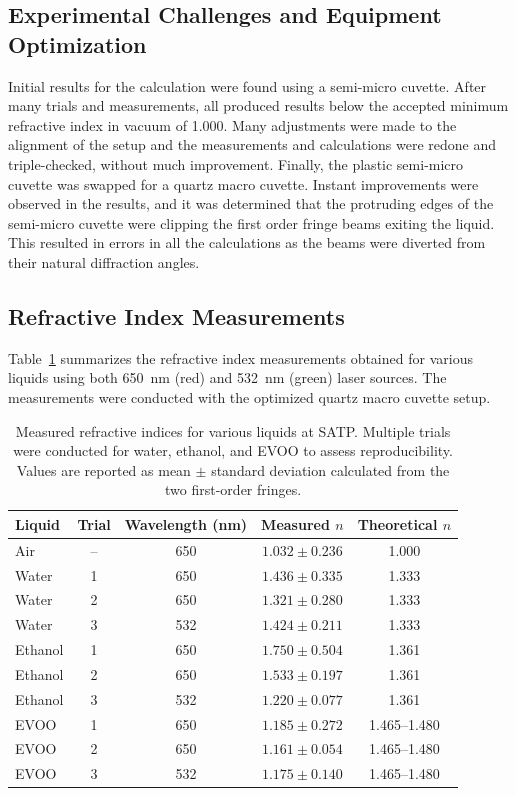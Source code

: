\subsection{Experimental Challenges and Equipment Optimization}
\label{subsec:experimental-challenges-and-equipment-optimization}

Initial results for the calculation were found using a semi-micro
cuvette.
After many trials and measurements, all produced results below the
accepted minimum refractive index in vacuum of 1.000.
Many adjustments were made to the alignment of the setup and the
measurements and calculations were redone and triple-checked, without
much improvement.
Finally, the plastic semi-micro cuvette was swapped for a quartz macro
cuvette.
Instant improvements were observed in the results, and it was determined
that the protruding edges of the semi-micro cuvette were clipping the
first order fringe beams exiting the liquid.
This resulted in errors in all the calculations as the beams were
diverted from their natural diffraction angles.

\subsection{Refractive Index Measurements}
\label{subsec:refractive-index-measurements}

Table~\ref{tab:results} summarizes the refractive index measurements
obtained for various liquids using both 650~nm (red) and 532~nm (green)
laser sources.
The measurements were conducted with the optimized quartz macro cuvette
setup.

\begin{table}[H]
\centering
\caption{Measured refractive indices for various liquids at SATP.
Multiple trials were conducted for water, ethanol, and EVOO to assess
reproducibility.
Values are reported as mean $\pm$ standard deviation calculated from
the two first-order fringes.}
\label{tab:results}
\begin{tabular}{lcccc}
\hline
\textbf{Liquid} & \textbf{Trial} & \textbf{Wavelength (nm)} & \textbf{Measured $n$} &
\textbf{Theoretical $n$} \\
\hline
Air & -- & 650 & $1.032 \pm 0.236$ & 1.000 \\
Water & 1 & 650 & $1.436 \pm 0.335$ & 1.333 \\
Water & 2 & 650 & $1.321 \pm 0.280$ & 1.333 \\
Water & 3 & 532 & $1.424 \pm 0.211$ & 1.333 \\
Ethanol & 1 & 650 & $1.750 \pm 0.504$ & 1.361 \\
Ethanol & 2 & 650 & $1.533 \pm 0.197$ & 1.361 \\
Ethanol & 3 & 532 & $1.220 \pm 0.077$ & 1.361 \\
EVOO & 1 & 650 & $1.185 \pm 0.272$ & 1.465--1.480 \\
EVOO & 2 & 650 & $1.161 \pm 0.054$ & 1.465--1.480 \\
EVOO & 3 & 532 & $1.175 \pm 0.140$ & 1.465--1.480 \\
\hline
\end{tabular}
\end{table}

